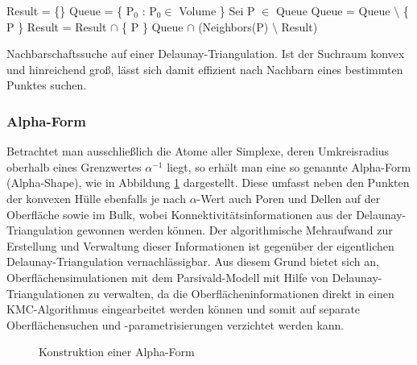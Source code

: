 \begin{algorithm}
  \centering
  \begin{algorithmic}
    \State Result = \{\}
    \State Queue = \{ P$_0$ : P$_0 \in$ Volume \}
    \State Sei P $\in$ Queue
    \State Queue = Queue $\setminus$ \{ P \}
    \State Result = Result $\cap$ \{ P \}
    \State Queue $\cap$ (Neighbors(P) $\setminus$ Result)
    \EndIf
    \EndWhile
  \end{algorithmic}
  \caption[Nachbarschaftssuche auf einer Delaunay-Triangulation]{Nachbarschaftssuche auf einer Delaunay-Triangulation.
    Ist der Suchraum konvex und hinreichend groß, lässt sich damit effizient nach Nachbarn eines bestimmten Punktes suchen.
  }
  \label{algo:delaunay-neighbors}
\end{algorithm}

\subsubsection{Alpha-Form}

Betrachtet man ausschließlich die Atome aller Simplexe, deren Umkreisradius oberhalb eines Grenzwertes $\alpha^{-1}$ liegt, so erhält man eine so genannte Alpha-Form (Alpha-Shape), wie in Abbildung \ref{fig:delaunay-alpha} dargestellt.
Diese umfasst neben den Punkten der konvexen Hülle ebenfalls je nach $\alpha$-Wert auch Poren und Dellen auf der Oberfläche sowie im Bulk, wobei Konnektivitätsinformationen aus der Delaunay-Triangulation gewonnen werden können.
Der algorithmische Mehraufwand zur Erstellung und Verwaltung dieser Informationen ist gegenüber der eigentlichen Delaunay-Triangulation vernachlässigbar.
Aus diesem Grund bietet sich an, Oberflächensimulationen mit dem Parsivald-Modell mit Hilfe von Delaunay-Triangulationen zu verwalten, da die Oberflächeninformationen direkt in einen KMC-Algorithmus eingearbeitet werden können und somit auf separate Oberflächensuchen und -parametrisierungen verzichtet werden kann.

\begin{figure}[bhpt]
  \centering
  \caption{Konstruktion einer Alpha-Form}
  \label{fig:delaunay-alpha}
\end{figure}
